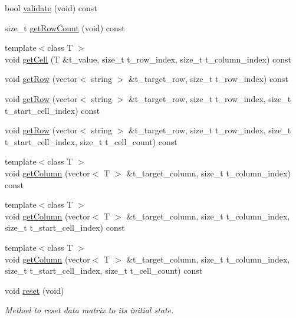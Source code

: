 \begin{DoxyCompactItemize}
\item 
bool \hyperlink{classutils_1_1SlightMatrix_a536e733a179ee3eaeb5c75986cc477d3}{validate} (void) const
\item 
size\+\_\+t \hyperlink{classutils_1_1SlightMatrix_af171e463492b423251369cd7b8799a97}{get\+Row\+Count} (void) const
\item 
{\footnotesize template$<$class T $>$ }\\void \hyperlink{classutils_1_1SlightMatrix_ae611736cad271a84df5ec2f8d4fca50d}{get\+Cell} (T \&t\+\_\+value, size\+\_\+t t\+\_\+row\+\_\+index, size\+\_\+t t\+\_\+column\+\_\+index) const
\item 
void \hyperlink{classutils_1_1SlightMatrix_ad236d7e2d1991624d221f0e077f4356e}{get\+Row} (vector$<$ string $>$ \&t\+\_\+target\+\_\+row, size\+\_\+t t\+\_\+row\+\_\+index) const
\item 
void \hyperlink{classutils_1_1SlightMatrix_a180518083776f29f5796ad67e788f9fa}{get\+Row} (vector$<$ string $>$ \&t\+\_\+target\+\_\+row, size\+\_\+t t\+\_\+row\+\_\+index, size\+\_\+t t\+\_\+start\+\_\+cell\+\_\+index) const
\item 
void \hyperlink{classutils_1_1SlightMatrix_ada228ea3f65e143162ee51437c6bffa1}{get\+Row} (vector$<$ string $>$ \&t\+\_\+target\+\_\+row, size\+\_\+t t\+\_\+row\+\_\+index, size\+\_\+t t\+\_\+start\+\_\+cell\+\_\+index, size\+\_\+t t\+\_\+cell\+\_\+count) const
\item 
{\footnotesize template$<$class T $>$ }\\void \hyperlink{classutils_1_1SlightMatrix_a66ed3d47be2a408a4f2fc0bcbb0d53f5}{get\+Column} (vector$<$ T $>$ \&t\+\_\+target\+\_\+column, size\+\_\+t t\+\_\+column\+\_\+index) const
\item 
{\footnotesize template$<$class T $>$ }\\void \hyperlink{classutils_1_1SlightMatrix_a641588a2717602d141001e05ed10ea0c}{get\+Column} (vector$<$ T $>$ \&t\+\_\+target\+\_\+column, size\+\_\+t t\+\_\+column\+\_\+index, size\+\_\+t t\+\_\+start\+\_\+cell\+\_\+index) const
\item 
{\footnotesize template$<$class T $>$ }\\void \hyperlink{classutils_1_1SlightMatrix_a4257bae1614d59a9f94afe6b12ce7ef7}{get\+Column} (vector$<$ T $>$ \&t\+\_\+target\+\_\+column, size\+\_\+t t\+\_\+column\+\_\+index, size\+\_\+t t\+\_\+start\+\_\+cell\+\_\+index, size\+\_\+t t\+\_\+cell\+\_\+count) const
\item 
\mbox{\label{classutils_1_1SlightMatrix_a9fa5e54d8c43cc967596f708a37aab50}} 
void \hyperlink{classutils_1_1SlightMatrix_a9fa5e54d8c43cc967596f708a37aab50}{reset} (void)
\begin{DoxyCompactList}\small\item\em Method to reset data matrix to its initial state. \end{DoxyCompactList}\end{DoxyCompactItemize}


